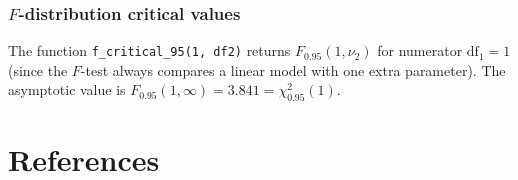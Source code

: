 \documentclass[12pt]{article}
\begin{document}
\subsubsection{$F$-distribution critical values}

The function \texttt{f\_critical\_95(1, df2)} returns
$F_{0.95}(1, \nu_2)$ for numerator $\mathrm{df}_1 = 1$ (since the
$F$-test always compares a linear model with one extra parameter).
The asymptotic value is $F_{0.95}(1, \infty) = 3.841 = \chi^2_{0.95}(1)$.

\section*{References}
\end{document}
